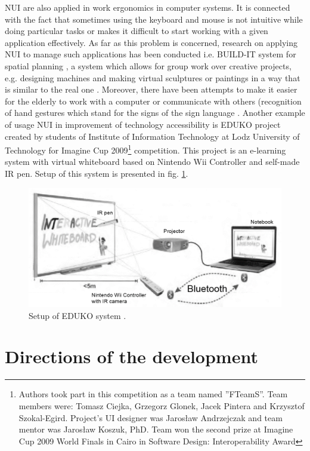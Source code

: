 \documentclass{jacsart}
\begin{document}
\indent NUI are also applied in work ergonomics in computer systems. It is connected with the fact that sometimes using the keyboard and mouse is not intuitive while doing particular tasks or makes it difficult to start working with a given application effectively. As far as this problem is concerned, research on applying NUI to manage such applications has been conducted i.e. BUILD-IT system for spatial planning \cite{Rauterberg1997}, a system which allows for group work over creative projects, e.g. designing machines and making virtual sculptures or paintings in a way that is similar to the real one \cite{Jr2011}. Moreover, there have been attempts to make it easier for the elderly \cite{Loureiro2011} to work with a computer or communicate with others (recognition of hand gestures which stand for the signs of the sign language \cite{Marnik2003, Myslinski2009, Ong2005}. Another example of usage NUI in improvement of technology accessibility is EDUKO project created by students of Institute of Information Technology at Lodz University of Technology for Imagine Cup 2009\footnote{Authors took part in this competition as a team named ''FTeamS''. Team members were: Tomasz Ciejka, Grzegorz Glonek, Jacek Pintera and Krzysztof Szokal-Egird. Project’s UI designer was Jarosław Andrzejczak and team mentor was Jarosław Koszuk, PhD. Team won the second prize at Imagine Cup 2009 World Finals in Cairo in Software Design: Interoperability Award} competition. This project is an e-learning system with virtual whiteboard based on Nintendo Wii Controller and self-made IR pen. Setup of this system is presented in fig. \ref{fig:eduko}.\\

 \begin{figure}[!t]
 \includegraphics[width=0.9\linewidth]{./eduko}
 \caption{Setup of EDUKO system \cite{Szokal2009}.}
 \label{fig:eduko}
 \end{figure}

\section{Directions of the development} \label{sec:development}
\end{document}

